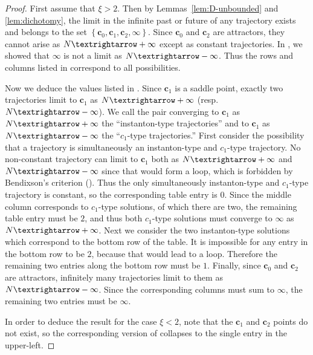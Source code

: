\begin{proof}
First assume that $\xi>2$. Then by Lemmas~\ref{lem:D-unbounded} and \ref{lem:dichotomy}, the limit in the infinite past or future of any trajectory exists and belongs to the set $\left\{ \mathbf{c}_{0},\mathbf{c}_{1},\mathbf{c}_{2},\bm{\infty}\right\} $. Since $\mathbf{c}_{0}$ and $\mathbf{c}_{2}$ are attractors, they cannot arise as $N\textrightarrow+\infty$ except as constant trajectories. In , we showed that $\infty$ is not a limit as $N\textrightarrow-\infty$. Thus the rows and columns listed in  correspond to all possibilities. 

Now we deduce the values listed in . Since $\mathbf{c}_{1}$ is a saddle point, exactly two trajectories limit to $\mathbf{c}_{1}$ as $N\textrightarrow+\infty$ (resp. $N\textrightarrow-\infty$). We call the pair converging to $\mathbf{c}_{1}$ as $N\textrightarrow+\infty$ the ``instanton-type trajectories'' and to $\mathbf{c}_{1}$ as $N\textrightarrow-\infty$ the ``$c_{1}$\nobreakdash-type trajectories.'' First consider the possibility that a trajectory is simultaneously an instanton-type and $c_{1}$\nobreakdash-type trajectory. No non-constant trajectory can limit to $\mathbf{c}_{1}$ both as $N\textrightarrow+\infty$ and $N\textrightarrow-\infty$ since that would form a loop, which is forbidden by Bendixson's criterion (). Thus the only simultaneously instanton-type and $c_{1}$\nobreakdash-type trajectory is constant, so the corresponding table entry is $0$. Since the middle column corresponds to $c_{1}$\nobreakdash-type solutions, of which there are two, the remaining table entry must be $2$, and thus both $c_{1}$\nobreakdash-type solutions must converge to $\bm{\infty}$ as $N\textrightarrow+\infty$. Next we consider the two instanton-type solutions which correspond to the bottom row of the table. It is impossible for any entry in the bottom row to be $2$, because that would lead to a loop. Therefore the remaining two entries along the bottom row must be $1$. Finally, since $\mathbf{c}_{0}$ and $\mathbf{c}_{2}$ are attractors, infinitely many trajectories limit to them as $N\textrightarrow-\infty$. Since the corresponding columns must sum to $\infty$, the remaining two entries must be $\infty$. 

In order to deduce the result for the case $\xi<2$, note that the $\mathbf{c}_{1}$ and $\mathbf{c}_{2}$ points do not exist, so the corresponding version of  collapses to the single entry in the upper-left. 
\end{proof}
